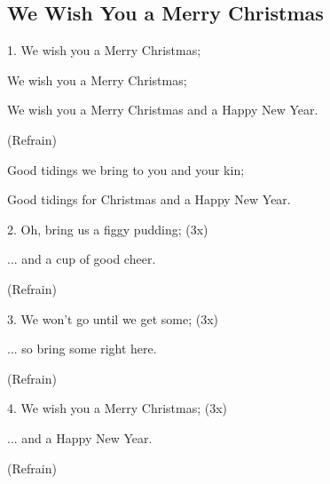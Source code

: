 \subsection{We Wish You a Merry Christmas}\label{we_wish}
\begin{description}[nosep,leftmargin=\parindent,labelsep=0pt]
\item 1. We wish you a Merry Christmas; 
\item We wish you a Merry Christmas; 
\item We wish you a Merry Christmas and a Happy New Year. 
\vspace{1.5ex}
\item (Refrain) 
\item Good tidings we bring to you and your kin; 
\item Good tidings for Christmas and a Happy New Year. 
\vspace{1.5ex}
\item 2. Oh, bring us a figgy pudding; (3x) 
\item ... and a cup of good cheer. 
\item (Refrain) 
\vspace{1.5ex}
\item 3. We won't go until we get some; (3x) 
\item ... so bring some right here. 
\item (Refrain) 
\vspace{1.5ex}
\item 4. We wish you a Merry Christmas; (3x) 
\item ... and a Happy New Year. 
\item (Refrain) 
\end{description}
